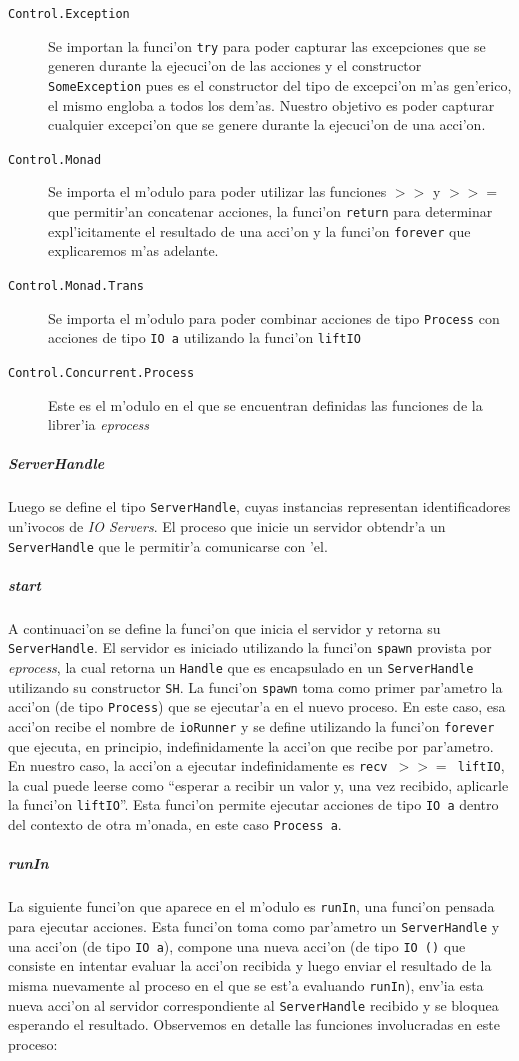 \documentclass[a4paper]{article}
\begin{document}
\begin{description}
	\item[\texttt{Control.Exception}] Se importan la funci'on \texttt{try} para poder capturar las excepciones que se generen durante la ejecuci'on de las acciones y el constructor \texttt{SomeException} pues es el constructor del tipo de excepci'on m'as gen'erico, el mismo engloba a todos los dem'as.  Nuestro objetivo es poder capturar cualquier excepci'on que se genere durante la ejecuci'on de una acci'on.
	\item[\texttt{Control.Monad}] Se importa el m'odulo para poder utilizar las funciones \texttt{$>>$} y \texttt{$>>=$} que permitir'an concatenar acciones, la funci'on \texttt{return} para determinar expl'icitamente el resultado de una acci'on y la funci'on \texttt{forever} que explicaremos m'as adelante.
	\item[\texttt{Control.Monad.Trans}] Se importa el m'odulo para poder combinar acciones de tipo \texttt{Process} con acciones de tipo \texttt{IO a} utilizando la funci'on \texttt{liftIO}
	\item[\texttt{Control.Concurrent.Process}] Este es el m'odulo en el que se encuentran definidas las funciones de la librer'ia \textsl{eprocess}
\end{description}
\subparagraph{ServerHandle}Luego se define el tipo \texttt{ServerHandle}, cuyas instancias representan identificadores un'ivocos de \textsl{IO Servers}.  El proceso que inicie un servidor obtendr'a un \texttt{ServerHandle} que le permitir'a comunicarse con 'el.
\subparagraph{start}A continuaci'on se define la funci'on que inicia el servidor y retorna su \texttt{ServerHandle}.  El servidor es iniciado utilizando la funci'on \texttt{spawn} provista por \textsl{eprocess}, la cual retorna un \texttt{Handle} que es encapsulado en un \texttt{ServerHandle} utilizando su constructor \texttt{SH}.  La funci'on \texttt{spawn} toma como primer par'ametro la acci'on (de tipo \texttt{Process}) que se ejecutar'a en el nuevo proceso.  En este caso, esa acci'on recibe el nombre de \texttt{ioRunner} y se define utilizando la funci'on \texttt{forever} que ejecuta, en principio, indefinidamente la acci'on que recibe por par'ametro.  En nuestro caso, la acci'on a ejecutar indefinidamente es \texttt{recv $>>=$ liftIO}, la cual puede leerse como ``esperar a recibir un valor y, una vez recibido, aplicarle la funci'on \texttt{liftIO}''.  Esta funci'on permite ejecutar acciones de tipo \texttt{IO a} dentro del contexto de otra m'onada, en este caso \texttt{Process a}.
\subparagraph{runIn} La siguiente funci'on que aparece en el m'odulo es \texttt{runIn}, una funci'on pensada para ejecutar acciones.  Esta funci'on toma como par'ametro un \texttt{ServerHandle} y una acci'on (de tipo \texttt{IO a}), compone una nueva acci'on (de tipo \texttt{IO ()} que consiste en intentar evaluar la acci'on recibida y luego enviar el resultado de la misma nuevamente al proceso en el que se est'a evaluando \texttt{runIn}), env'ia esta nueva acci'on al servidor correspondiente al \texttt{ServerHandle} recibido y se bloquea esperando el resultado.  Observemos en detalle las funciones involucradas en este proceso:
\end{document}
